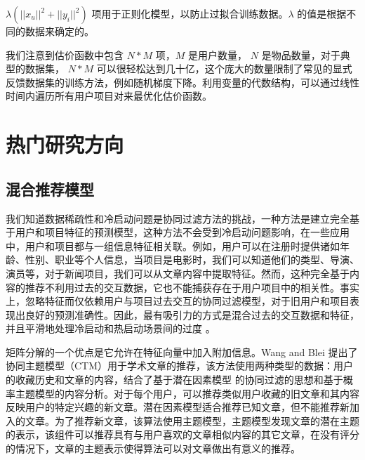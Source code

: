 $\lambda(||x_u||^2 + ||y_i||^2)$ 项用于正则化模型，以防止过拟合训练数据。$\lambda$ 的值是根据不同的数据来确定的。

我们注意到估价函数中包含 $N * M​$ 项，$M​$ 是用户数量， $N​$ 是物品数量，对于典型的数据集， $N * M​$ 可以很轻松达到几十亿，这个庞大的数量限制了常见的显式反馈数据集的训练方法，例如随机梯度下降。利用变量的代数结构，可以通过线性时间内遍历所有用户项目对来最优化估价函数。




\chapter{热门研究方向} %
\label{sec:热门研究方向}

\section{混合推荐模型} %
\label{sec:混合推荐模型}
我们知道数据稀疏性和冷启动问题是协同过滤方法的挑战，一种方法是建立完全基于用户和项目特征的预测模型，这种方法不会受到冷启动问题影响，在一些应用中，用户和项目都与一组信息特征相关联。例如，用户可以在注册时提供诸如年龄、性别、职业等个人信息，当项目是电影时，我们可以知道他们的类型、导演、演员等，对于新闻项目，我们可以从文章内容中提取特征。然而，这种完全基于内容的推荐不利用过去的交互数据，它也不能捕获存在于用户项目中的相关性\cite{Wang2011Collaborative}。事实上，忽略特征而仅依赖用户与项目过去交互的协同过滤模型，对于旧用户和项目表现出良好的预测准确性。因此，最有吸引力的方式是混合过去的交互数据和特征，并且平滑地处理冷启动和热启动场景间的过度 \cite{Agarwal2009Regression}。

矩阵分解的一个优点是它允许在特征向量中加入附加信息。Wang and Blei \cite{Wang2011Collaborative}提出了协同主题模型（CTM）用于学术文章的推荐，该方法使用两种类型的数据：用户的收藏历史和文章的内容，结合了基于潜在因素模型 \cite{Agarwal2009Regression,Salakhutdinov2007Probabilistic} 的协同过滤的思想和基于概率主题模型的内容分析\cite{Blei2003Latent,Chang2009Reading}。对于每个用户，可以推荐类似用户收藏的旧文章和其内容反映用户的特定兴趣的新文章。潜在因素模型适合推荐已知文章，但不能推荐新加入的文章。为了推荐新文章，该算法使用主题模型，主题模型发现文章的潜在主题的表示，该组件可以推荐具有与用户喜欢的文章相似内容的其它文章，在没有评分的情况下，文章的主题表示使得算法可以对文章做出有意义的推荐。

